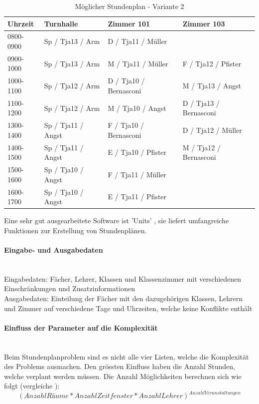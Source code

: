 \begin{table}[ht]
\centering
  \begin{tabular}{ l | l | l | l }
	\hline
	\rowcolor{gray}
	\textbf{Uhrzeit} 	& \textbf{Turnhalle}	& \textbf{Zimmer 101} 	& \textbf{Zimmer 103}	\\ \hline
	0800-0900		& Sp / Tja13 / Arm		& D / Tja11 / Müller		& 				\\ \hline
	0900-1000		& Sp / Tja13 / Arm		& M / Tja11 / Müller		& F / Tja12 / Pfister		\\ \hline
	1000-1100		& Sp / Tja12 / Arm		& D / Tja10 / Bernasconi	& M / Tja13 / Angst		\\ \hline
	1100-1200		& Sp / Tja12 / Arm		& M / Tja10 / Angst		& D / Tja13 / Bernasconi	\\ \hline \hline
	1300-1400		& Sp / Tja11 / Angst	& F / Tja10 / Bernasconi	& D / Tja12 / Müller		\\ \hline
	1400-1500		& Sp / Tja11 / Angst	& E / Tja10 / Pfister		& M / Tja12 / Bernasconi	\\ \hline
	1500-1600		& Sp / Tja10 / Angst	& F / Tja11 / Müller		& 				\\ \hline
	1600-1700		& Sp / Tja10 / Angst	& E / Tja11 / Pfister		& 				\\ \hline
  \end{tabular}
   \caption{Möglicher Stundenplan - Variante 2}\label{table:timetable_2}
\end{table}

\FloatBarrier
	Eine sehr gut ausgearbeitete Software ist 'Units' \cite{unit_express}, sie liefert umfangreiche Funktionen zur Erstellung von Stundenplänen.

	\paragraph{Eingabe- und Ausgabedaten}\mbox{}\\
	Eingabedaten: Fächer, Lehrer, Klassen und Klassenzimmer mit verschiedenen Einschränkungen und Zusatzinformationen\\
	Ausgabedaten: Einteilung der Fächer mit den dazugehörigen Klassen, Lehrern und Zimmer auf verschiedene Tage und Uhrzeiten, welche keine Konflikte enthält

	\paragraph{Einfluss der Parameter auf die Komplexität}\mbox{}\\
	Beim Stundenplanproblem sind es nicht alle vier Listen, welche die Komplexität des Problems ausmachen. Den grössten Einfluss haben die Anzahl Stunden, welche verplant werden 
	müssen. Die Anzahl Möglichkeiten berechnen sich wie folgt (vergleiche \cite{scheduling_komplex}): 
	\[(Anzahl Räume * Anzahl Zeitfenster * Anzahl Lehrer)^{Anzahl Veranstaltungen}\]

